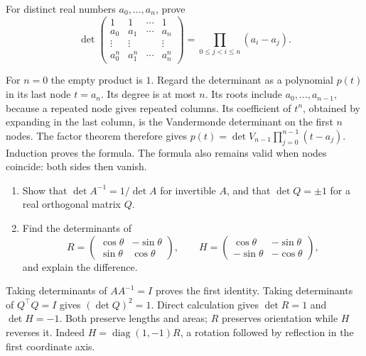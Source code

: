 \begin{problem}\label{ex:07:vandermonde}
For distinct real numbers \(a_0,\ldots,a_n\), prove
\[
 \det\begin{pmatrix}
 1&1&\cdots&1\\a_0&a_1&\cdots&a_n\\
 \vdots&\vdots&&\vdots\\a_0^n&a_1^n&\cdots&a_n^n
 \end{pmatrix}
 =\prod_{0\leqslant j<i\leqslant n}(a_i-a_j).
\]
\end{problem}
\begin{solution}
For \(n=0\) the empty product is \(1\). Regard the determinant as a
polynomial \(p(t)\) in its last node \(t=a_n\). Its degree is at most \(n\).
Its roots include \(a_0,\ldots,a_{n-1}\), because a repeated node gives
repeated columns. Its coefficient of \(t^n\), obtained by expanding in
the last column, is the Vandermonde determinant on the first \(n\) nodes.
The factor theorem therefore gives
\(p(t)=\det V_{n-1}\prod_{j=0}^{n-1}(t-a_j)\).
Induction proves the formula. The formula also remains valid when nodes
coincide: both sides then vanish.
\end{solution}

\begin{problem}\label{ex:07:orientation}
\begin{enumerate}
\item Show that \(\det A^{-1}=1/\det A\) for invertible \(A\), and that
\(\det Q=\pm1\) for a real orthogonal matrix \(Q\).
\item Find the determinants of
\[
 R=\begin{pmatrix}\cos\theta&-\sin\theta\\\sin\theta&\cos\theta\end{pmatrix},
 \qquad
 H=\begin{pmatrix}\cos\theta&-\sin\theta\\-\sin\theta&-\cos\theta\end{pmatrix},
\]
and explain the difference.
\end{enumerate}
\end{problem}
\begin{solution}
Taking determinants of \(AA^{-1}=I\) proves the first identity.
Taking determinants of \(Q^\top Q=I\) gives \((\det Q)^2=1\).
Direct calculation gives \(\det R=1\) and \(\det H=-1\).
Both preserve lengths and areas; \(R\) preserves orientation while \(H\)
reverses it. Indeed \(H=\operatorname{diag}(1,-1)R\), a rotation followed
by reflection in the first coordinate axis.
\end{solution}

